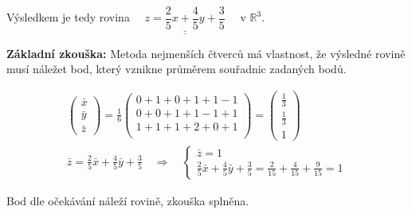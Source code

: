 \documentclass[12pt]{article}
\begin{document}
Výsledkem je tedy rovina $\quad \underline{\underline{z = \dfrac{2}{5}x + \dfrac{4}{5}y + \dfrac{3}{5}}} \quad$ v $\mathbb{R}^3$.

\bigskip
\textbf{Základní zkouška:} Metoda nejmenších čtverců má vlastnost, že výsledné rovině musí náležet bod, který vznikne průměrem souřadnic zadaných bodů.

\begin{align*}
  \left(\begin{array}{c}
    \bar{x} \\ \bar{y} \\ \bar{z}
  \end{array}\right) = \frac{1}{6} \left(\begin{array}{c}
    0+1+0+1+1-1 \\
    0+0+1+1-1+1 \\
    1+1+1+2+0+1 \\
  \end{array}\right) = \left(\begin{array}{c}
    \frac{1}{3} \\[.5em]
    \frac{1}{3} \\[.5em]
    1
  \end{array}\right)
  \\
  \bar{z} = \frac{2}{5}\bar{x} + \frac{4}{5}\bar{y} + \frac{3}{5}
  \quad\Rightarrow \quad \begin{cases}
    \bar{z} = 1 \\[1em]
    \frac{2}{5}\bar{x} + \frac{4}{5}\bar{y} + \frac{3}{5} = \frac{2}{15} + \frac{4}{15} + \frac{9}{15} = 1
  \end{cases}
\end{align*}

Bod dle očekávání náleží rovině, zkouška splněna.
\end{document}
